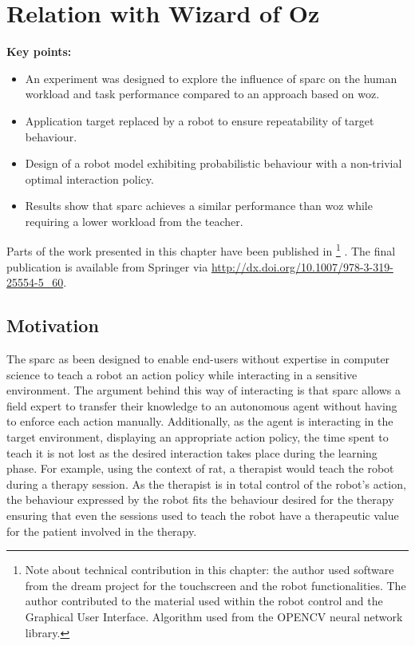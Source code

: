 \chapter{Relation with Wizard of Oz}\label{chap:woz}

\graphicspath{{images/woz/}}

\begin{framed}
	\textbf{Key points:}
	
	\begin{itemize}
		\item An experiment was designed to explore the influence of \gls{sparc} on the human workload and task performance compared to an approach based on \gls{woz}.
		\item Application target replaced by a robot to ensure repeatability of target behaviour.
		\item Design of a robot model exhibiting probabilistic behaviour with a non-trivial optimal interaction policy.
		\item Results show that \gls{sparc} achieves a similar performance than \gls{woz} while requiring a lower workload from the teacher.
	\end{itemize}
\end{framed}

Parts of the work presented in this chapter have been published in \cite{senft2015sparc} \footnote{Note about technical contribution in this chapter: the author used software from the \gls{dream} project for the touchscreen and the robot functionalities. The author contributed to the material used within the robot control and the Graphical User Interface. Algorithm used from the OPENCV neural network library.} . The final publication is available from Springer via \url{http://dx.doi.org/10.1007/978-3-319-25554-5_60}.

\newpage

\section{Motivation}

The \acrfull{sparc} as been designed to enable end-users without expertise in computer science to teach a robot an action policy while interacting in a sensitive environment. The argument behind this way of interacting is that \gls{sparc} allows a field expert to transfer their knowledge to an autonomous agent without having to enforce each action manually. Additionally, as the agent is interacting in the target environment, displaying an appropriate action policy, the time spent to teach it is not lost as the desired interaction takes place during the learning phase. For example, using the context of \gls{rat}, a therapist would teach the robot during a therapy session. As the therapist is in total control of the robot's action, the behaviour expressed by the robot fits the  behaviour desired for the therapy ensuring that even the sessions used to teach the robot have a therapeutic value for the patient involved in the therapy.

